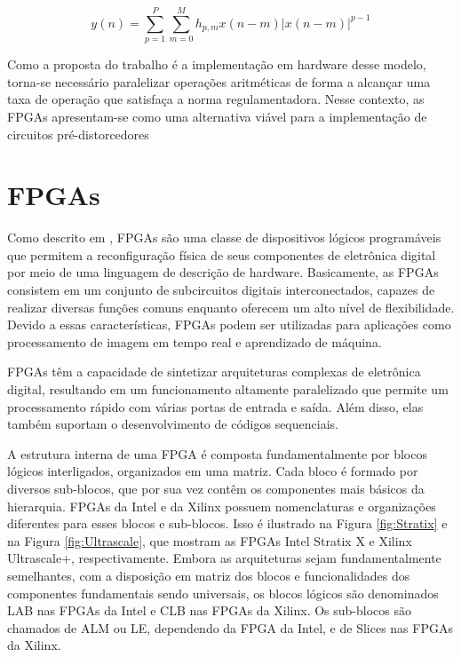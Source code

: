 \begin{equation}
    y(n) = \sum_{p=1}^{P} \sum_{m=0}^{M} h_{p,m} x(n - m) \left| x(n - m) \right|^{p-1}
    \label{eq:mp}
\end{equation}

Como a proposta do trabalho é a implementação em hardware desse modelo, torna-se necessário paralelizar operações aritméticas de forma a alcançar uma taxa de operação que satisfaça a norma regulamentadora. Nesse contexto, as FPGAs apresentam-se como uma alternativa viável para a implementação de circuitos pré-distorcedores 

\section{FPGAs}

Como descrito em \cite{Pedroni2010}, FPGAs são uma classe de dispositivos lógicos programáveis que permitem a reconfiguração física de seus componentes de eletrônica digital por meio de uma linguagem de descrição de hardware. Basicamente, as FPGAs consistem em um conjunto de subcircuitos digitais interconectados, capazes de realizar diversas funções comuns enquanto oferecem um alto nível de flexibilidade. Devido a essas características, FPGAs podem ser utilizadas para aplicações como processamento de imagem em tempo real e aprendizado de máquina.

FPGAs têm a capacidade de sintetizar arquiteturas complexas de eletrônica digital, resultando em um funcionamento altamente paralelizado que permite um processamento rápido com várias portas de entrada e saída. Além disso, elas também suportam o desenvolvimento de códigos sequenciais.

A estrutura interna de uma FPGA é composta fundamentalmente por blocos lógicos interligados, organizados em uma matriz. Cada bloco é formado por diversos sub-blocos, que por sua vez contêm os componentes mais básicos da hierarquia. FPGAs da Intel e da Xilinx possuem nomenclaturas e organizações diferentes para esses blocos e sub-blocos. Isso é ilustrado na Figura \ref{fig:Stratix} e na Figura \ref{fig:Ultrascale}, que mostram as FPGAs Intel Stratix X e Xilinx Ultrascale+, respectivamente. Embora as arquiteturas sejam fundamentalmente semelhantes, com a disposição em matriz dos blocos e funcionalidades dos componentes fundamentais sendo universais, os blocos lógicos são denominados LAB nas FPGAs da Intel e CLB nas FPGAs da Xilinx. Os sub-blocos são chamados de ALM ou LE, dependendo da FPGA da Intel, e de Slices nas FPGAs da Xilinx.

